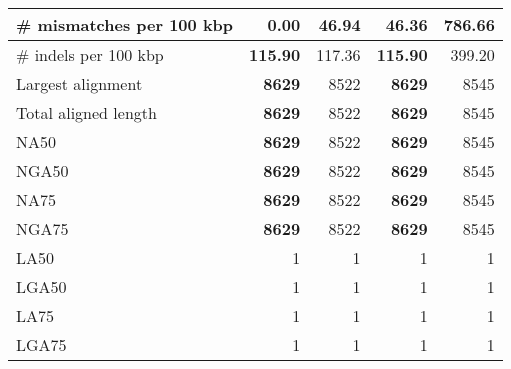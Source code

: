\documentclass[12pt,a4paper]{article}
\begin{document}
\begin{table}[ht]
\begin{center}
\begin{tabular}{|l*{4}{|r}|}
\# mismatches per 100 kbp & {\bf 0.00} & 46.94 & 46.36 & 786.66 \\ \hline
\# indels per 100 kbp & {\bf 115.90} & 117.36 & {\bf 115.90} & 399.20 \\ \hline
Largest alignment & {\bf 8629} & 8522 & {\bf 8629} & 8545 \\ \hline
Total aligned length & {\bf 8629} & 8522 & {\bf 8629} & 8545 \\ \hline
NA50 & {\bf 8629} & 8522 & {\bf 8629} & 8545 \\ \hline
NGA50 & {\bf 8629} & 8522 & {\bf 8629} & 8545 \\ \hline
NA75 & {\bf 8629} & 8522 & {\bf 8629} & 8545 \\ \hline
NGA75 & {\bf 8629} & 8522 & {\bf 8629} & 8545 \\ \hline
LA50 & 1 & 1 & 1 & 1 \\ \hline
LGA50 & 1 & 1 & 1 & 1 \\ \hline
LA75 & 1 & 1 & 1 & 1 \\ \hline
LGA75 & 1 & 1 & 1 & 1 \\ \hline
\end{tabular}
\end{center}
\end{table}
\end{document}
